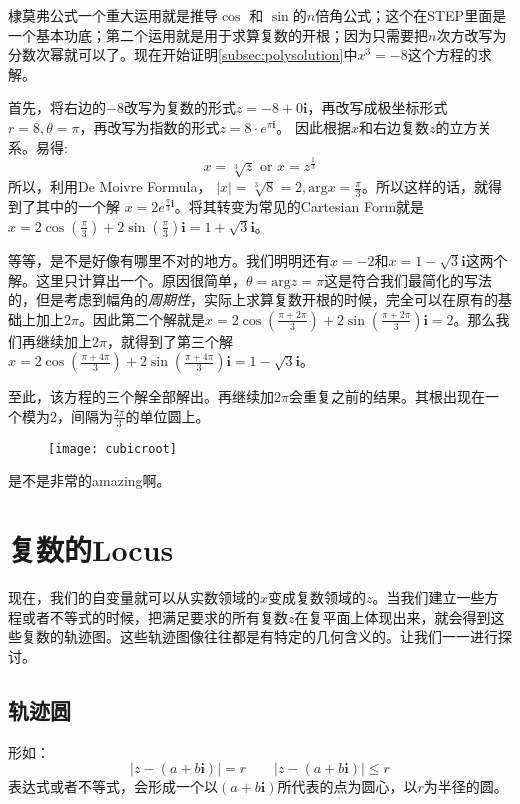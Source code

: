 棣莫弗公式一个重大运用就是推导$\cos$ 和 $\sin$的$n$倍角公式；这个在STEP里面是一个基本功底；第二个运用就是用于求算复数的开根；因为只需要把$n$次方改写为分数次幂就可以了。现在开始证明\ref{subsec:polysolution}中$x^3=-8$这个方程的求解。
\begin{ExampleBox}
 首先，将右边的$-8$改写为复数的形式$z=-8+0\mathbf{i}$，再改写成极坐标形式$r=8,\theta=\pi$，再改写为指数的形式$z=8\cdot e^{\pi\mathbf{i}}$。
 因此根据$x$和右边复数$z$的立方关系。易得:
 \[
 	x=\sqrt[3]{z} \text{ or } x=z^{\frac{1}{3}}
 \]
 所以，利用De Moivre Formula， $|x|=\sqrt[3]{8}=2, \text{arg} x =\frac{\pi}{3}$。所以这样的话，就得到了其中的一个解 $x=2 e^{\frac{\pi}{3} \mathbf{i}}$。将其转变为常见的Cartesian Form就是$x= 2\cos(\frac{\pi}{3})+2\sin(\frac{\pi}{3})\mathbf{i}=1+\sqrt{3}\mathbf{i}$。

 等等，是不是好像有哪里不对的地方。我们明明还有$x=-2$和$x=1-\sqrt{3}\mathbf{i}$这两个解。这里只计算出一个。原因很简单，$\theta =\text{arg} z=\pi$这是符合我们最简化的写法的，但是考虑到幅角的\emph{周期性}，实际上求算复数开根的时候，完全可以在原有的基础上加上$2\pi$。因此第二个解就是$x= 2\cos(\frac{\pi+2\pi}{3})+2\sin(\frac{\pi+2\pi}{3})\mathbf{i}=2$。那么我们再继续加上$2\pi$，就得到了第三个解$x= 2\cos(\frac{\pi+4\pi}{3})+2\sin(\frac{\pi+4\pi}{3})\mathbf{i}=1-\sqrt{3}\mathbf{i}$。

 至此，该方程的三个解全部解出。再继续加$2\pi$会重复之前的结果。其根出现在一个模为$2$，间隔为$\frac{2\pi}{3}$的单位圆上。
 \begin{figure}[H]
 \centering
 \texttt{[image: cubicroot]}
 \end{figure}
 是不是非常的amazing啊。
\end{ExampleBox}
\clearpage


\section{复数的Locus}
现在，我们的自变量就可以从实数领域的$x$变成复数领域的$z$。当我们建立一些方程或者不等式的时候，把满足要求的所有复数$z$在复平面上体现出来，就会得到这些复数的轨迹图。这些轨迹图像往往都是有特定的几何含义的。让我们一一进行探讨。

\subsection*{轨迹圆}
形如：
\[
	|z-(a+b\mathbf{i})|=r \qquad |z-(a+b\mathbf{i})|\leqslant r
\]
表达式或者不等式，会形成一个以$(a+b\mathbf{i})$所代表的点为圆心，以$r$为半径的圆。

